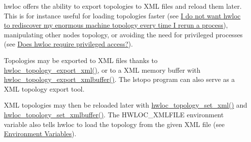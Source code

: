 

hwloc offers the ability to export topologies to X\+ML files and reload them later. This is for instance useful for loading topologies faster (see \hyperlink{a00394_faq_xml}{I do not want hwloc to rediscover my enormous machine topology every time I rerun a process}), manipulating other nodes\textquotesingle{} topology, or avoiding the need for privileged processes (see \hyperlink{a00394_faq_privileged}{Does hwloc require privileged access?}).

Topologies may be exported to X\+ML files thanks to \hyperlink{a00206_ga333f79975b4eeb28a3d8fad3373583ce}{hwloc\+\_\+topology\+\_\+export\+\_\+xml()}, or to a X\+ML memory buffer with \hyperlink{a00206_gad33b7f7c11db10459505a3b1634fd3f1}{hwloc\+\_\+topology\+\_\+export\+\_\+xmlbuffer()}. The lstopo program can also serve as a X\+ML topology export tool.

X\+ML topologies may then be reloaded later with \hyperlink{a00192_ga879439b7ee99407ee911b3ac64e9a25e}{hwloc\+\_\+topology\+\_\+set\+\_\+xml()} and \hyperlink{a00192_ga2745616b65595e1c1e579ecc7e461fa8}{hwloc\+\_\+topology\+\_\+set\+\_\+xmlbuffer()}. The H\+W\+L\+O\+C\+\_\+\+X\+M\+L\+F\+I\+LE environment variable also tells hwloc to load the topology from the given X\+ML file (see \hyperlink{a00382}{Environment Variables}).


